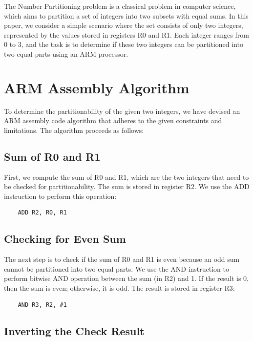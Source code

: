 The Number Partitioning problem is a classical problem in computer science, which aims to partition a set of integers into two subsets with equal sums. In this paper, we consider a simple scenario where the set consists of only two integers, represented by the values stored in registers R0 and R1. Each integer ranges from 0 to 3, and the task is to determine if these two integers can be partitioned into two equal parts using an ARM processor.

\section{ARM Assembly Algorithm}

To determine the partitionability of the given two integers, we have devised an ARM assembly code algorithm that adheres to the given constraints and limitations. The algorithm proceeds as follows:

\subsection{Sum of R0 and R1}

First, we compute the sum of R0 and R1, which are the two integers that need to be checked for partitionability. The sum is stored in register R2. We use the ADD instruction to perform this operation:

\begin{verbatim}
    ADD R2, R0, R1
\end{verbatim}

\subsection{Checking for Even Sum}

The next step is to check if the sum of R0 and R1 is even because an odd sum cannot be partitioned into two equal parts. We use the AND instruction to perform bitwise AND operation between the sum (in R2) and 1. If the result is 0, then the sum is even; otherwise, it is odd. The result is stored in register R3:

\begin{verbatim}
    AND R3, R2, #1
\end{verbatim}

\subsection{Inverting the Check Result}

